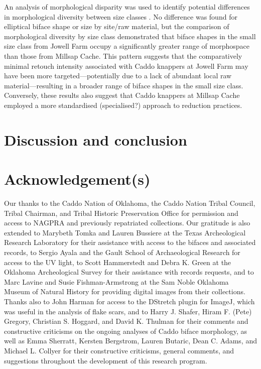\documentclass[]{interact}
\theoremstyle{plain}%
\theoremstyle{definition}
\theoremstyle{remark}
\begin{document}
An analysis of morphological disparity was used to identify potential
differences in morphological diversity between size classes
\citep{RN11107,RN7041,RN5694}. No difference was found for elliptical
biface shape or size by site/raw material, but the comparison of
morphological diversity by size class demonstrated that biface shapes in
the small size class from Jowell Farm occupy a significantly greater
range of morphospace than those from Millsap Cache. This pattern
suggests that the comparatively minimal retouch intensity associated
with Caddo knappers at Jowell Farm may have been more
targeted---potentially due to a lack of abundant local raw
material---resulting in a broader range of biface shapes in the small
size class. Conversely, these results also suggest that Caddo knappers
at Millsap Cache employed a more standardised (specialised?) approach to
reduction practices.

\hypertarget{discussion-and-conclusion}{%
\section{Discussion and conclusion}\label{discussion-and-conclusion}}

\hypertarget{acknowledgements}{%
\section*{Acknowledgement(s)}\label{acknowledgements}}

Our thanks to the Caddo Nation of Oklahoma, the Caddo Nation Tribal
Council, Tribal Chairman, and Tribal Historic Preservation Office for
permission and access to NAGPRA and previously repatriated collections.
Our gratitude is also extended to Marybeth Tomka and Lauren Bussiere at
the Texas Archeological Research Laboratory for their assistance with
access to the bifaces and associated records, to Sergio Ayala and the
Gault School of Archaeological Research for access to the UV light, to
Scott Hammerstedt and Debra K. Green at the Oklahoma Archeological
Survey for their assistance with records requests, and to Marc Lavine
and Susie Fishman-Armstrong at the Sam Noble Oklahoma Museum of Natural
History for providing digital images from their collections. Thanks also
to John Harman for access to the DStretch plugin for ImageJ, which was
useful in the analysis of flake scars, and to Harry J. Shafer, Hiram F.
(Pete) Gregory, Christian S. Hoggard, and David K. Thulman for their
comments and constructive criticisms on the ongoing analyses of Caddo
biface morphology, as well as Emma Sherratt, Kersten Bergstrom, Lauren
Butaric, Dean C. Adams, and Michael L. Collyer for their constructive
criticisms, general comments, and suggestions throughout the development
of this research program.
\end{document}
